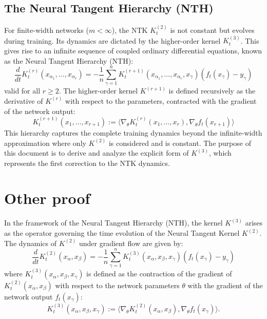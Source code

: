\documentclass[a4paper]{article}
\begin{document}
\subsection{The Neural Tangent Hierarchy (NTH)}
For finite-width networks ($m < \infty$), the NTK $K^{(2)}_t$ is not constant but evolves during training. Its dynamics are dictated by the higher-order kernel $K^{(3)}_t$. This gives rise to an infinite sequence of coupled ordinary differential equations, known as the Neural Tangent Hierarchy (NTH):
\begin{equation}
\frac{d}{dt} K^{(r)}_t(x_{\alpha_1}, \dots, x_{\alpha_r}) = -\frac{1}{n} \sum_{\gamma=1}^n K^{(r+1)}_t(x_{\alpha_1}, \dots, x_{\alpha_r}, x_\gamma) (f_t(x_\gamma) - y_\gamma)
\end{equation}
valid for all $r \ge 2$. The higher-order kernel $K^{(r+1)}$ is defined recursively as the derivative of $K^{(r)}$ with respect to the parameters, contracted with the gradient of the network output:
\begin{equation}
K^{(r+1)}_t(x_1, \dots, x_{r+1}) := \langle \nabla_\theta K^{(r)}_t(x_1, \dots, x_r), \nabla_\theta f_t(x_{r+1}) \rangle
\end{equation}
This hierarchy captures the complete training dynamics beyond the infinite-width approximation where only $K^{(2)}$ is considered and is constant. The purpose of this document is to derive and analyze the explicit form of $K^{(3)}$, which represents the first correction to the NTK dynamics.

\section{Other proof}

In the framework of the Neural Tangent Hierarchy (NTH), the kernel $K^{(3)}$ arises as the operator governing the time evolution of the Neural Tangent Kernel $K^{(2)}$. The dynamics of $K^{(2)}$ under gradient flow are given by:
\begin{equation}
\frac{d}{dt} K^{(2)}_t(x_\alpha, x_\beta) = -\frac{1}{n} \sum_{\gamma=1}^n K^{(3)}_t(x_\alpha, x_\beta, x_\gamma) (f_t(x_\gamma) - y_\gamma)
\end{equation}
where $K^{(3)}_t(x_\alpha, x_\beta, x_\gamma)$ is defined as the contraction of the gradient of $K^{(2)}_t(x_\alpha, x_\beta)$ with respect to the network parameters $\theta$ with the gradient of the network output $f_t(x_\gamma)$:
\begin{equation}
K^{(3)}_t(x_\alpha, x_\beta, x_\gamma) := \langle \nabla_\theta K^{(2)}_t(x_\alpha, x_\beta), \nabla_\theta f_t(x_\gamma) \rangle.
\end{equation}
\end{document}
